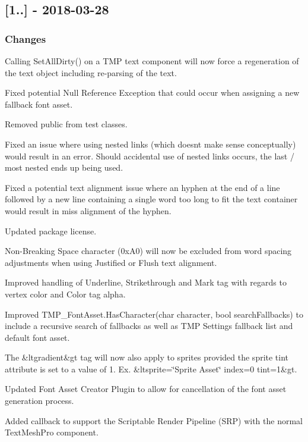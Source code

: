 \subsection*{\mbox{[}1..\mbox{]} -\/ 2018-\/03-\/28}

\subsubsection*{Changes}


\begin{DoxyItemize}
\item Calling Set\+All\+Dirty() on a T\+MP text component will now force a regeneration of the text object including re-\/parsing of the text.
\item Fixed potential Null Reference Exception that could occur when assigning a new fallback font asset.
\item Removed public from test classes.
\item Fixed an issue where using nested links (which doesn\textquotesingle{}t make sense conceptually) would result in an error. Should accidental use of nested links occurs, the last / most nested ends up being used.
\item Fixed a potential text alignment issue where an hyphen at the end of a line followed by a new line containing a single word too long to fit the text container would result in miss alignment of the hyphen.
\item Updated package license.
\item Non-\/\+Breaking Space character (0x\+A0) will now be excluded from word spacing adjustments when using Justified or Flush text alignment.
\item Improved handling of Underline, Strikethrough and Mark tag with regards to vertex color and Color tag alpha.
\item Improved T\+M\+P\+\_\+\+Font\+Asset.\+Has\+Character(char character, bool search\+Fallbacks) to include a recursive search of fallbacks as well as T\+MP Settings fallback list and default font asset.
\item The \&ltgradient\&gt tag will now also apply to sprites provided the sprite tint attribute is set to a value of 1. Ex. \&ltsprite=\char`\"{}\+Sprite Asset\char`\"{} index=0 tint=1\&gt.
\item Updated Font Asset Creator Plugin to allow for cancellation of the font asset generation process.
\item Added callback to support the Scriptable Render Pipeline (S\+RP) with the normal Text\+Mesh\+Pro component.

\end{DoxyItemize}
